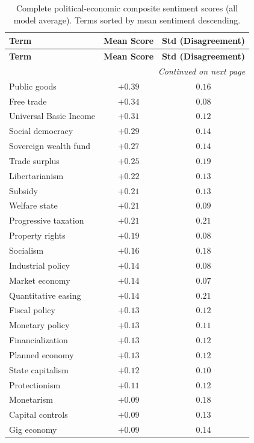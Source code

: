 \documentclass[11pt, letterpaper]{article}
\begin{document}
\begin{longtable}{lcc}
  \caption{Complete political-economic composite sentiment scores (all model average). Terms sorted by mean sentiment descending.}
  \label{tab:appendix_political_economic_composite_consensus} \\
  \toprule
  \textbf{Term} & \textbf{Mean Score} & \textbf{Std (Disagreement)} \\
  \midrule
  \endfirsthead
  \toprule
  \textbf{Term} & \textbf{Mean Score} & \textbf{Std (Disagreement)} \\
  \midrule
  \endhead
  \midrule
  \multicolumn{3}{r}{\textit{Continued on next page}} \\
  \endfoot
  \bottomrule
  \endlastfoot
  Public goods & $+0.39$ & $0.16$ \\
  Free trade & $+0.34$ & $0.08$ \\
  Universal Basic Income & $+0.31$ & $0.12$ \\
  Social democracy & $+0.29$ & $0.14$ \\
  Sovereign wealth fund & $+0.27$ & $0.14$ \\
  Trade surplus & $+0.25$ & $0.19$ \\
  Libertarianism & $+0.22$ & $0.13$ \\
  Subsidy & $+0.21$ & $0.13$ \\
  Welfare state & $+0.21$ & $0.09$ \\
  Progressive taxation & $+0.21$ & $0.21$ \\
  Property rights & $+0.19$ & $0.08$ \\
  Socialism & $+0.16$ & $0.18$ \\
  Industrial policy & $+0.14$ & $0.08$ \\
  Market economy & $+0.14$ & $0.07$ \\
  Quantitative easing & $+0.14$ & $0.21$ \\
  Fiscal policy & $+0.13$ & $0.12$ \\
  Monetary policy & $+0.13$ & $0.11$ \\
  Financialization & $+0.13$ & $0.12$ \\
  Planned economy & $+0.13$ & $0.12$ \\
  State capitalism & $+0.12$ & $0.10$ \\
  Protectionism & $+0.11$ & $0.12$ \\
  Monetarism & $+0.09$ & $0.18$ \\
  Capital controls & $+0.09$ & $0.13$ \\
  Gig economy & $+0.09$ & $0.14$ \\

\end{longtable}
\end{document}
